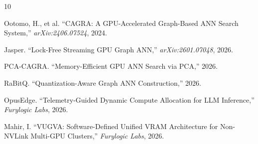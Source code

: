 \documentclass[11pt,twocolumn]{article}
\begin{document}
\begin{thebibliography}{10}

Ootomo, H., et al. ``CAGRA: A GPU-Accelerated Graph-Based ANN Search System,'' \textit{arXiv:2406.07524}, 2024.

Jasper. ``Lock-Free Streaming GPU Graph ANN,'' \textit{arXiv:2601.07048}, 2026.

PCA-CAGRA. ``Memory-Efficient GPU ANN Search via PCA,'' 2026.

RaBitQ. ``Quantization-Aware Graph ANN Construction,'' 2026.

OpusEdge. ``Telemetry-Guided Dynamic Compute Allocation for LLM Inference,'' \textit{Furylogic Labs}, 2026.

Mahir, I. ``VUGVA: Software-Defined Unified VRAM Architecture for Non-NVLink Multi-GPU Clusters,'' \textit{Furylogic Labs}, 2026.

\end{thebibliography}
\end{document}
